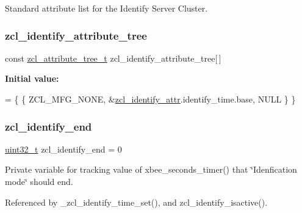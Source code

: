 Standard attribute list for the Identify Server Cluster. 

\mbox{\label{group__zcl__identify_gadebf533d91e359185eb3c0e1e7f044d7}} 
\subsubsection{\texorpdfstring{zcl\+\_\+identify\+\_\+attribute\+\_\+tree}{zcl\_identify\_attribute\_tree}}
{\footnotesize\ttfamily const \hyperlink{structzcl__attribute__tree__t}{zcl\+\_\+attribute\+\_\+tree\+\_\+t} zcl\+\_\+identify\+\_\+attribute\+\_\+tree\mbox{[}$\,$\mbox{]}}

{\bfseries Initial value\+:}
\begin{DoxyCode}
=
      \{ \{ ZCL\_MFG\_NONE, &\hyperlink{group__zcl__identify_ga794a6ffcf3d47884c65a8a2c9e60851b}{zcl\_identify\_attr}.identify\_time.base, NULL \} \}
\end{DoxyCode}
\mbox{\label{group__zcl__identify_ga467ad1e40ea8475b4e49865436883e94}} 
\subsubsection{\texorpdfstring{zcl\+\_\+identify\+\_\+end}{zcl\_identify\_end}}
{\footnotesize\ttfamily \hyperlink{group__hal__dos_ga09a1e304d66d35dd47daffee9731edaa}{uint32\+\_\+t} zcl\+\_\+identify\+\_\+end = 0}



Private variable for tracking value of xbee\+\_\+seconds\+\_\+timer() that \char`\"{}\+Idenfication mode\char`\"{} should end. 



Referenced by \+\_\+zcl\+\_\+identify\+\_\+time\+\_\+set(), and zcl\+\_\+identify\+\_\+isactive().

